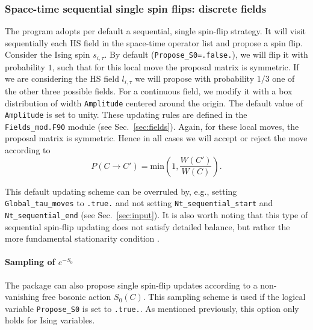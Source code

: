 \subsubsection{Space-time sequential single spin flips: discrete fields}
\label{sec:sequential}
The program adopts per default a sequential, single spin-flip strategy. It will visit sequentially each HS field in the space-time operator list and  propose a spin flip. Consider  the Ising spin $s_{i,\tau}$. By default (\texttt{Propose\_S0=.false.}), we will flip it with probability $1$, such that for  this local move  the  proposal matrix is symmetric.  If we are considering the HS field $l_{i,\tau}$  we will propose with probability $1/3$ one  of the other three  possible fields.    For a continuous field, we  modify it with a box distribution of width \texttt{Amplitude}  centered around the origin.   The default value of  \texttt{Amplitude} is set to unity. These updating rules are defined in the   \texttt{Fields\_mod.F90} module  (see Sec.~\ref{sec:fields}). Again, for these local moves, the proposal matrix is symmetric.  Hence in all cases we will accept or reject the move according to 
\begin{equation}
P(C \rightarrow C') =  \text{min}  \left( 1, \frac{ W(C')}{W(C)} \right).
\end{equation}

This default updating scheme can be overruled by, e.g., setting \texttt{Global\_tau\_moves} to \texttt{.true.} and not setting \texttt{Nt\_sequential\_start} and \texttt{Nt\_sequential\_end} (see Sec.~\ref{sec:input}).
It is also worth noting that this type of sequential spin-flip updating does not satisfy detailed balance, but rather the more fundamental stationarity condition \cite{Sokal89}. 


% 
\paragraph{Sampling of $e^{-S_0}$}
\label{sec:S0}
% 
The package can also propose single spin-flip updates according to a non-vanishing free bosonic 
action $S_0(C)$. This sampling scheme is used if the logical variable \texttt{Propose\_S0} is set to \texttt{.true.}.   
As mentioned previously, this option only holds for Ising variables. 

